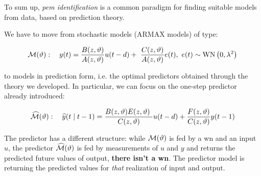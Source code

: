 
To sum up, \textit{\gls{pem} identification} is a common paradigm for finding suitable models from data, based on prediction theory.

We have to move from stochastic models (ARMAX models) of type: 

$$
\Mc(\theta):\quad
y(t) = \frac{B(z,\theta)}{A(z,\theta)} u(t-d) +\ \frac{C(z,\theta)}{A(z,\theta)} e(t) ,\ e(t)\sim \WN \left(0,\lambda ^{2}\right)
$$

to models in prediction form, i.e. the optimal predictors obtained through the theory we developed. In particular, we can focus on the one-step predictor already introduced:

$$
\widehat{\mathcal{M}}(\vartheta):\quad
\widehat{y}(t\mid t-1) = \frac{B(z,\vartheta) E(z,\vartheta) \ }{C(z,\vartheta)} u(t-d) + \frac{F(z,\vartheta)}{C(z,\vartheta)} y(t-1)
$$

The predictor has a different structure: while $ \mathcal{M}(\vartheta)$ is fed by a \gls{wn} and an input $u$, the predictor $\widehat{\mathcal{M}}(\vartheta)$ is fed by measurements of $u$ and $y$ and returns the predicted future values of output, \textbf{there isn't a \gls{wn}}. The predictor model is returning the predicted values for \textit{that} realization of input and output.

\begin{figure}[htpb]
	\centering
	\begin{subfigure}{.5\textwidth}
		\centering
	\end{subfigure}%
	\begin{subfigure}{.5\textwidth}
		\centering
	\end{subfigure}
\end{figure}
\FloatBarrier

